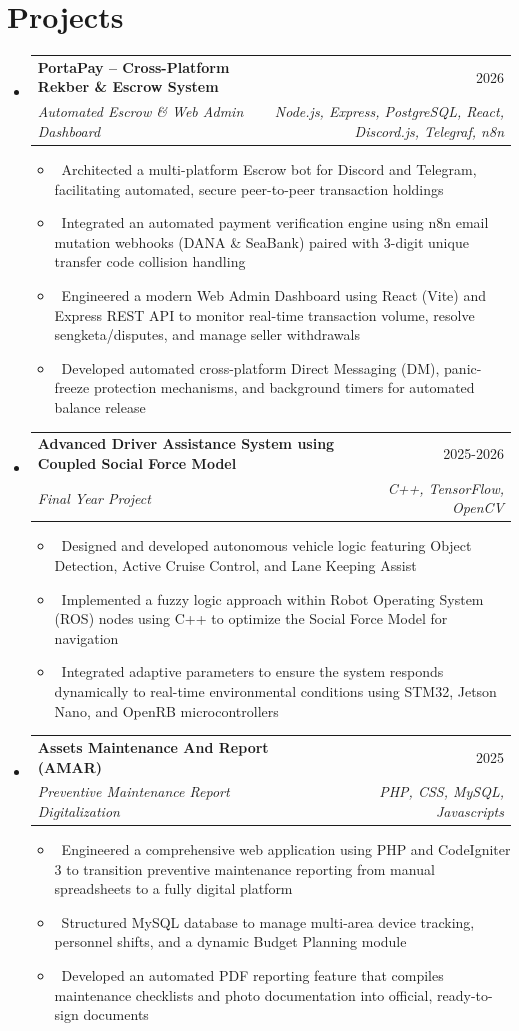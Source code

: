 \documentclass[letterpaper,10pt]{article}
\makeatletter
\newcommand{\resumeItem}[1]{\item\small{#1}}
\newcommand{\resumeSubheading}[4]{
\vspace{-1pt}\item
  \begin{tabular*}{0.97\textwidth}[t]{l@{\extracolsep{\fill}}r}
    \textbf{#1} & #2 \\
    \textit{#3} & \textit{#4} \\
  \end{tabular*}\vspace{-7pt}
}
\newcommand{\resumeSubHeadingList}{\begin{itemize}[leftmargin=0.15in, label={}]}
\newcommand{\resumeSubHeadingListEnd}{\end{itemize}}
\makeatother
\begin{document}
\section{Projects}
\resumeSubHeadingList
    \resumeSubheading
      {PortaPay -- Cross-Platform Rekber \& Escrow System}{2026} 
      {Automated Escrow \& Web Admin Dashboard}{Node.js, Express, PostgreSQL, React, Discord.js, Telegraf, n8n}
      \resumeSubHeadingList
          \resumeItem{\textbullet\ Architected a multi-platform Escrow bot for Discord and Telegram, facilitating automated, secure peer-to-peer transaction holdings}
          \resumeItem{\textbullet\ Integrated an automated payment verification engine using n8n email mutation webhooks (DANA \& SeaBank) paired with 3-digit unique transfer code collision handling}
          \resumeItem{\textbullet\ Engineered a modern Web Admin Dashboard using React (Vite) and Express REST API to monitor real-time transaction volume, resolve sengketa/disputes, and manage seller withdrawals}
          \resumeItem{\textbullet\ Developed automated cross-platform Direct Messaging (DM), panic-freeze protection mechanisms, and background timers for automated balance release}
      \resumeSubHeadingListEnd
  \resumeSubheading
      {Advanced Driver Assistance System using Coupled Social Force Model}{2025-2026}
      {Final Year Project}{C++, TensorFlow, OpenCV}
      \resumeSubHeadingList
          \resumeItem{\textbullet\ Designed and developed autonomous vehicle logic featuring Object Detection, Active Cruise Control, and Lane Keeping Assist}
          \resumeItem{\textbullet\ Implemented a fuzzy logic approach within Robot Operating System (ROS) nodes using C++ to optimize the Social Force Model for navigation}
          \resumeItem{\textbullet\ Integrated adaptive parameters to ensure the system responds dynamically to real-time environmental conditions using STM32, Jetson Nano, and OpenRB microcontrollers}
      \resumeSubHeadingListEnd
    \resumeSubheading
      {Assets Maintenance And Report (AMAR)}{2025} 
      {Preventive Maintenance Report Digitalization}{PHP, CSS, MySQL, Javascripts}
      \resumeSubHeadingList
          \resumeItem{\textbullet\ Engineered a comprehensive web application using PHP and CodeIgniter 3 to transition preventive maintenance reporting from manual spreadsheets to a fully digital platform}
          \resumeItem{\textbullet\ Structured MySQL database to manage multi-area device tracking, personnel shifts, and a dynamic Budget Planning module}
          \resumeItem{\textbullet\ Developed an automated PDF reporting feature that compiles maintenance checklists and photo documentation into official, ready-to-sign documents}
      \resumeSubHeadingListEnd
\resumeSubHeadingListEnd
\end{document}
